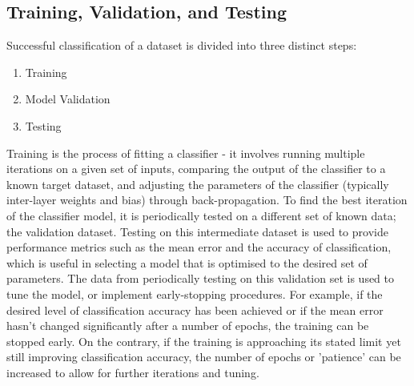 %




\subsection{Training, Validation, and Testing}\label{lit:loocv}
Successful classification of a dataset is divided into three distinct steps:
\begin{enumerate}
	\item Training
	\item Model Validation
	\item Testing
\end{enumerate}

Training is the process of fitting a classifier - it involves running multiple iterations on a given set of inputs, comparing the output of the classifier to a known target dataset, and adjusting the parameters of the classifier (typically inter-layer weights and bias) through back-propagation. To find the best iteration of the classifier model, it is periodically tested on a different set of known data; the validation dataset. Testing on this intermediate dataset is used to provide performance metrics such as the mean error and the accuracy of classification, which is useful in selecting a model that is optimised to the desired set of parameters. The data from periodically testing on this validation set is used to tune the model, or implement early-stopping procedures. For example, if the desired level of classification accuracy has been achieved or if the mean error hasn't changed significantly after a number of epochs, the training can be stopped early. On the contrary, if the training is approaching its stated limit yet still improving classification accuracy, the number of epochs or 'patience' can be increased to allow for further iterations and tuning.

